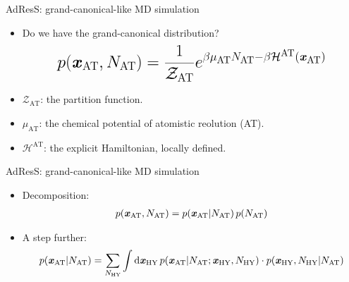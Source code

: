 \documentclass[]{beamer}
\newcommand{\redc}[1]{{\color{red} #1}}
\newcommand{\bluec}[1]{{\color{blue} #1}}
\newcommand{\vect}[1]{\textbf{\textit{#1}}}
\newcommand{\AT}{{\textrm{{AT}}}}
\newcommand{\EX}{{\textrm{AT}}}
\newcommand{\HY}{{\textrm{HY}}}
\begin{document}
\begin{frame}{AdResS: grand-canonical-like MD simulation}  
  \vfill
  \begin{itemize}\itemsep .4cm
  \item <1->
    \bluec{Do we have the grand-canonical distribution?}
  \vfill
  \redc{
    \begin{align*}
      \mathlarger{\mathlarger{\mathlarger{
      p(\vect x_\AT, N_\AT) = \frac{1}{\mathcal Z_\EX}
      e^{\beta\mu_{\EX} N_\AT - \beta \mathcal H^{\EX}(\vect x_\AT)} }}}
    \end{align*}
  }      
  \vfill
  \item<2-> \bluec{$\mathcal Z_\EX$}: the partition function.
  \item<3-> \bluec{$\mu_{\EX}$}: the chemical potential of atomistic reolution (AT).
  \item<4-> \bluec{$\mathcal H^{\EX}$}: the explicit Hamiltonian, locally defined.
  \end{itemize}
  \vfill
\end{frame}


\begin{frame}{AdResS: grand-canonical-like MD simulation}
  \begin{itemize}
  \item <1-> Decomposition:
    \bluec{
      \begin{align*}
        p(\vect x_\AT, N_\AT) = p(\vect x_\AT \vert N_\AT) \,{p (N_\AT)}
      \end{align*}}
  \item <2-> A step further:
    \bluec{
      \begin{align*}
        p(\vect x_\AT \vert N_\AT) =
        \sum_{N_\HY} \int \textrm{d}\vect x_\HY\,
        p(\vect x_\AT \vert N_\AT; \vect x_\HY, N_\HY)\cdot
        p(\vect x_\HY, N_\HY\vert N_\AT)
      \end{align*}
    }
  \end{itemize}
\end{frame}
\end{document}
